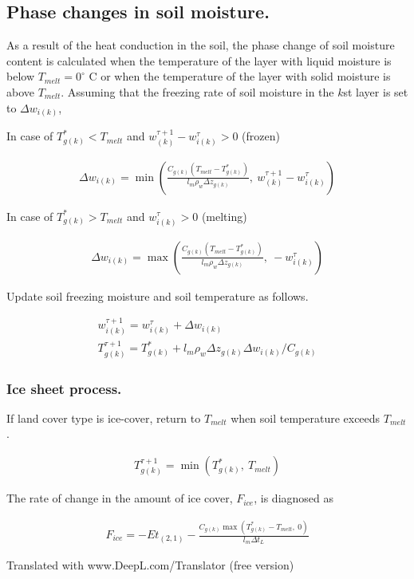 \hypertarget{phase-changes-in-soil-moisture.}{%
\subsection{Phase changes in soil
moisture.}\label{phase-changes-in-soil-moisture.}}

As a result of the heat conduction in the soil, the phase change of soil
moisture content is calculated when the temperature of the layer with
liquid moisture is below \(T_{melt} = 0^{\circ}\) C or when the
temperature of the layer with solid moisture is above \(T_{melt}\).
Assuming that the freezing rate of soil moisture in the \(k\)st layer is
set to \(\Delta w_{i(k)}\),

In case of \(T_{g(k)}^*<T_{melt}\) and
\(w_{(k)}^{\tau+1}-w_{i(k)}^{\tau}>0\) (frozen)

\begin{eqnarray}
\Delta w_{i(k)} = \min\left(
\frac{C_{g(k)}(T_{melt}-T_{g(k)}^*)}{l_m \rho_w \Delta z_{g(k)}}, \
w_{(k)}^{\tau+1}-w_{i(k)}^{\tau}
\right)
\end{eqnarray}

In case of \(T_{g(k)}^*>T_{melt}\) and \(w_{i(k)}^{\tau}>0\) (melting)

\begin{eqnarray}
\Delta w_{i(k)} = \max\left(
\frac{C_{g(k)}(T_{melt}-T_{g(k)}^*)}{l_m \rho_w \Delta z_{g(k)}}, \
-w_{i(k)}^{\tau}
\right)
\end{eqnarray}

Update soil freezing moisture and soil temperature as follows.

\begin{eqnarray}
w_{i(k)}^{\tau+1} = w_{i(k)}^{\tau} + \Delta w_{i(k)} \\
T_{g(k)}^{\tau+1} = T_{g(k)}^* + l_m \rho_w \Delta z_{g(k)} \Delta w_{i(k)} / C_{g(k)}
\end{eqnarray}

\hypertarget{ice-sheet-process.}{%
\subsubsection{Ice sheet process.}\label{ice-sheet-process.}}

If land cover type is ice-cover, return to \(T_{melt}\) when soil
temperature exceeds \(T_{melt}\).

\begin{eqnarray}
 T_{g(k)}^{\tau+1} = \min( T_{g(k)}^*, \ T_{melt} )
\end{eqnarray}

The rate of change in the amount of ice cover, \(F_{ice}\), is diagnosed
as

\begin{eqnarray}
 F_{ice} = - Et_{(2,1)} - \frac{C_{g(k)}\max(T_{g(k)}^* - T_{melt},\ 0)}{l_m \Delta t_L}
\end{eqnarray}

Translated with www.DeepL.com/Translator (free version)
